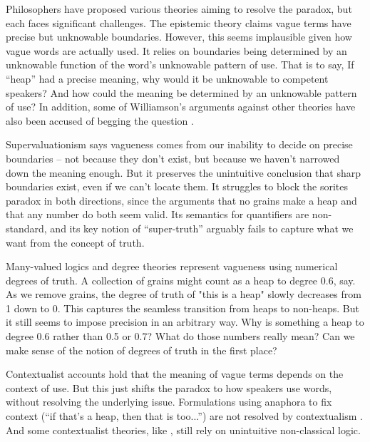 \documentclass{article}
\begin{document}
Philosophers have proposed various theories aiming to resolve the paradox, but each faces significant challenges. The epistemic theory \autocite{sorensenBlindspots1988,williamsonKnowledgeItsLimits2000} claims vague terms have precise but unknowable boundaries. However, this seems implausible given how vague words are actually used. It relies on boundaries being determined by an unknowable function of the word's unknowable pattern of use. That is to say, If ``heap'' had a precise meaning, why would it be unknowable to competent speakers? And how could the meaning be determined by an unknowable pattern of use? In addition, some of Williamson's arguments against other theories have also been accused of begging the question \autocite{wrightEpistemicConceptionVagueness2021}.

Supervaluationism \autocite{fineVaguenessTruthLogic1975,keefeTheoriesVagueness2000} says vagueness comes from our inability to decide on precise boundaries -- not because they don't exist, but because we haven't narrowed down the meaning enough. But it preserves the unintuitive conclusion that sharp boundaries exist, even if we can't locate them. It struggles to block the sorites paradox in both directions, since the arguments that no grains make a heap and that any number do both seem valid. Its semantics for quantifiers are non-standard, and its key notion of ``super-truth'' arguably fails to capture what we want from the concept of truth.

Many-valued logics and degree theories \autocite{goguenLogicInexactConcepts1969,zadehFuzzyLogicApproximate1975,smithVaguenessDegreesTruth2008} represent vagueness using numerical degrees of truth. A collection of grains might count as a heap to degree 0.6, say. As we remove grains, the degree of truth of "this is a heap" slowly decreases from 1 down to 0. This captures the seamless transition from heaps to non-heaps. But it still seems to impose precision in an arbitrary way. Why is something a heap to degree 0.6 rather than 0.5 or 0.7? What do those numbers really mean? Can we make sense of the notion of degrees of truth in the first place?

Contextualist accounts \autocite{kampParadoxHeap1981,soamesUnderstandingTruth1999} hold that the meaning of vague terms depends on the context of use. But this just shifts the paradox to how speakers use words, without resolving the underlying issue. Formulations using anaphora to fix context (``if that's a heap, then that is too...'') are not resolved by contextualism \autocite{stanleyContextInterestRelativity2003}. And some contextualist theories, like \textcite{shapiroVaguenessContext2006}, still rely on unintuitive non-classical logic.
\end{document}
